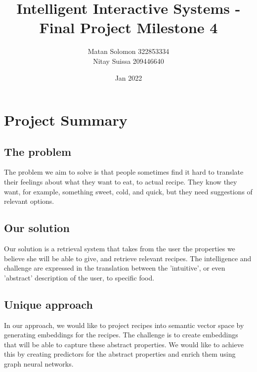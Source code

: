 \documentclass[]{article}
\title{\vspace{-2cm}Intelligent Interactive Systems - Final Project Milestone 4}
\author{Matan Solomon 322853334 \\ Nitay Suissa 209446640}
\date{Jan 2022}
\begin{document}
\maketitle
\section{Project Summary}
\subsection{The problem}
The problem we aim to solve is that people sometimes find it hard to translate their feelings about what they want to eat, to actual recipe. They know they want, for example, something sweet, cold, and quick, but they need suggestions of relevant options.
\subsection{Our solution}
Our solution is a retrieval system that takes from the user the properties we believe she will be able to give, and retrieve relevant recipes. The intelligence and challenge are expressed in the translation between the 'intuitive', or even 'abstract' description of the user, to specific food.
\subsection{Unique approach}
In our approach, we would like to project recipes into semantic vector space by generating embeddings for the recipes. The challenge is to create embeddings that will be able to capture these abstract properties. We would like to achieve this by creating predictors for the abstract properties and enrich them using graph neural networks. 
\end{document}
